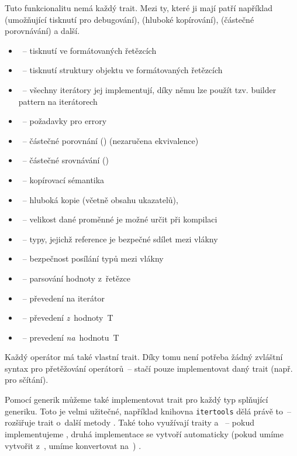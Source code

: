 \documentclass[main.tex]{subfiles}
\begin{document}
Tuto funkcionalitu nemá každý trait. Mezi ty, které ji mají patří například
 (umožňující tisknutí pro debugování),  (hluboké kopírování),
 (částečné porovnávání) a další. \cite[Appendix C]{thebook}


\begin{itemize}
    \item {}~-- tisknutí ve formátovaných řetězcích
    \item {}~-- tisknutí struktury objektu ve formátovaných řetězcích
    \item {}~-- všechny iterátory jej implementují, díky němu lze použít
          tzv. builder pattern na iterátorech
    \item {}~-- požadavky pro errory
    \item {}~-- částečné porovnání (\irust{==}) (nezaručena ekvivalence)
    \item {}~-- částečné srovnávání (\irust{< > <= >=})
    \item {}~-- kopírovací sémantika
    \item {}~-- hluboká kopie (včetně obsahu ukazatelů), 
    \item {}~-- velikost dané proměnné je možné určit při kompilaci
    \item {}~-- typy, jejichž reference je bezpečné sdílet mezi vlákny
    \item {}~-- bezpečnost posílání typů mezi vlákny
    \item {}~-- parsování hodnoty z~řetězce
    \item {}~-- převedení na iterátor
    \item {}~-- převedení \emph{z}~hodnoty~T
    \item {}~-- prevedení \emph{na}~hodnotu~T
\end{itemize}
Každý operátor má také vlastní trait. Díky tomu není potřeba žádný zvláštní syntax pro
přetěžování operátorů~-- stačí pouze implementovat daný trait (např.  pro
sčítání). \cite[sekce\,19.2]{thebook}


Pomocí generik můžeme také implementovat trait pro každý typ splňující generiku. Toto je
velmi užitečné, například knihovna \texttt{itertools} dělá právě to~-- rozšiřuje
 trait o~další metody \cite[itertools, src/itertools/lib.rs]{docsrs}. Také
toho využívají traity  a ~-- pokud implementujeme ,
druhá implementace se vytvoří automaticky (pokud umíme vytvořit  z~,
umíme konvertovat  na~) \cite[convert/trait.From]{ruststd}.
\end{document}
